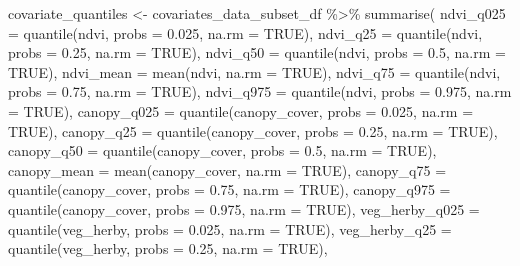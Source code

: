 \documentclass[
  letterpaper,
  DIV=11,
  numbers=noendperiod]{scrartcl}
\newenvironment{Shaded}{\begin{snugshade}}{\end{snugshade}}
\newcommand{\AttributeTok}[1]{\textcolor[rgb]{0.40,0.45,0.13}{#1}}
\newcommand{\ConstantTok}[1]{\textcolor[rgb]{0.56,0.35,0.01}{#1}}
\newcommand{\FloatTok}[1]{\textcolor[rgb]{0.68,0.00,0.00}{#1}}
\newcommand{\FunctionTok}[1]{\textcolor[rgb]{0.28,0.35,0.67}{#1}}
\newcommand{\NormalTok}[1]{\textcolor[rgb]{0.00,0.23,0.31}{#1}}
\newcommand{\OtherTok}[1]{\textcolor[rgb]{0.00,0.23,0.31}{#1}}
\newcommand{\SpecialCharTok}[1]{\textcolor[rgb]{0.37,0.37,0.37}{#1}}
\begin{document}
\begin{Shaded}
\begin{Highlighting}[]
\NormalTok{covariate\_quantiles }\OtherTok{\textless{}{-}}\NormalTok{ covariates\_data\_subset\_df }\SpecialCharTok{\%\textgreater{}\%} 
  \FunctionTok{summarise}\NormalTok{(}
    \AttributeTok{ndvi\_q025 =} \FunctionTok{quantile}\NormalTok{(ndvi, }\AttributeTok{probs =} \FloatTok{0.025}\NormalTok{, }\AttributeTok{na.rm =} \ConstantTok{TRUE}\NormalTok{),}
    \AttributeTok{ndvi\_q25 =} \FunctionTok{quantile}\NormalTok{(ndvi, }\AttributeTok{probs =} \FloatTok{0.25}\NormalTok{, }\AttributeTok{na.rm =} \ConstantTok{TRUE}\NormalTok{),}
    \AttributeTok{ndvi\_q50 =} \FunctionTok{quantile}\NormalTok{(ndvi, }\AttributeTok{probs =} \FloatTok{0.5}\NormalTok{, }\AttributeTok{na.rm =} \ConstantTok{TRUE}\NormalTok{),}
    \AttributeTok{ndvi\_mean =} \FunctionTok{mean}\NormalTok{(ndvi, }\AttributeTok{na.rm =} \ConstantTok{TRUE}\NormalTok{),}
    \AttributeTok{ndvi\_q75 =} \FunctionTok{quantile}\NormalTok{(ndvi, }\AttributeTok{probs =} \FloatTok{0.75}\NormalTok{, }\AttributeTok{na.rm =} \ConstantTok{TRUE}\NormalTok{),}
    \AttributeTok{ndvi\_q975 =} \FunctionTok{quantile}\NormalTok{(ndvi, }\AttributeTok{probs =} \FloatTok{0.975}\NormalTok{, }\AttributeTok{na.rm =} \ConstantTok{TRUE}\NormalTok{),}
    \AttributeTok{canopy\_q025 =} \FunctionTok{quantile}\NormalTok{(canopy\_cover, }\AttributeTok{probs =} \FloatTok{0.025}\NormalTok{, }\AttributeTok{na.rm =} \ConstantTok{TRUE}\NormalTok{),}
    \AttributeTok{canopy\_q25 =} \FunctionTok{quantile}\NormalTok{(canopy\_cover, }\AttributeTok{probs =} \FloatTok{0.25}\NormalTok{, }\AttributeTok{na.rm =} \ConstantTok{TRUE}\NormalTok{),}
    \AttributeTok{canopy\_q50 =} \FunctionTok{quantile}\NormalTok{(canopy\_cover, }\AttributeTok{probs =} \FloatTok{0.5}\NormalTok{, }\AttributeTok{na.rm =} \ConstantTok{TRUE}\NormalTok{),}
    \AttributeTok{canopy\_mean =} \FunctionTok{mean}\NormalTok{(canopy\_cover, }\AttributeTok{na.rm =} \ConstantTok{TRUE}\NormalTok{),}
    \AttributeTok{canopy\_q75 =} \FunctionTok{quantile}\NormalTok{(canopy\_cover, }\AttributeTok{probs =} \FloatTok{0.75}\NormalTok{, }\AttributeTok{na.rm =} \ConstantTok{TRUE}\NormalTok{),}
    \AttributeTok{canopy\_q975 =} \FunctionTok{quantile}\NormalTok{(canopy\_cover, }\AttributeTok{probs =} \FloatTok{0.975}\NormalTok{, }\AttributeTok{na.rm =} \ConstantTok{TRUE}\NormalTok{),}
    \AttributeTok{veg\_herby\_q025 =} \FunctionTok{quantile}\NormalTok{(veg\_herby, }\AttributeTok{probs =} \FloatTok{0.025}\NormalTok{, }\AttributeTok{na.rm =} \ConstantTok{TRUE}\NormalTok{),}
    \AttributeTok{veg\_herby\_q25 =} \FunctionTok{quantile}\NormalTok{(veg\_herby, }\AttributeTok{probs =} \FloatTok{0.25}\NormalTok{, }\AttributeTok{na.rm =} \ConstantTok{TRUE}\NormalTok{),}

\end{Highlighting}
\end{Shaded}
\end{document}
